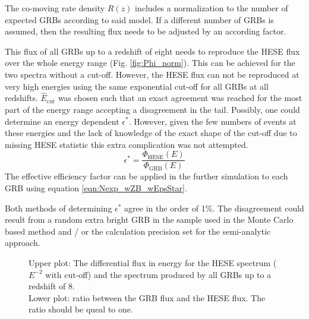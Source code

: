 

The co-moving rate density $R(z)$ includes a normalization to the number of
expected GRBs according to said model. If a different number of GRBs is
assumed, then the resulting flux needs to be adjusted by an according factor.

This flux of all GRBs up to a redshift of eight needs to reproduce the HESE
flux over the whole energy range (Fig. \ref{fig:Phi_norm}). This can be
achieved for the two spectra without a cut-off.
However, the HESE flux can not be reproduced at very high energies using the
same
exponential cut-off for all GRBs at all redshifts. $\hat{E}_\text{cut}$ was
chosen such that an exact agreement was reached for the most part of the energy
range accepting a disagreement in the tail. Possibly, one could determine an
energy dependent $\epsilon^*$. However, given the few numbers of events at
these energies and the lack of knowledge of the exact shape of the cut-off due
to missing HESE statistic this extra complication was not attempted.
\begin{equation}
 \epsilon^* = \frac{\Phi_\text{HESE}(E)}{\Phi_\text{GRB}(E)}
\end{equation}
The effective efficiency factor can be applied in the further simulation to
each GRB using equation \ref{eqn:Nexp_wZB_wEpsStar}.

Both methods of determining $\epsilon^*$ agree in the order of 1\%. The 
disagreement could result from a random extra bright GRB in the sample used in 
the Monte Carlo based method and / or the calculation precision set for the 
semi-analytic approach.
\begin{figure}[h]
 \centering
 \captionsetup{width=.9\textwidth}
 \caption{Upper plot: The differential flux in energy for the HESE spectrum
($E^{-2}$ with cut-off) and the spectrum produced by all GRBs up to a redshift
of 8. \\
Lower plot: ratio between the GRB flux and the HESE flux. The ratio should be
queal to one.}
\end{figure}




